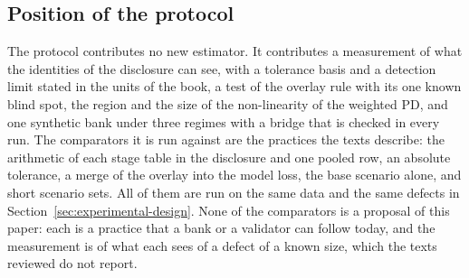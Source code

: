 \subsection{Position of the protocol}
\label{sec:rw-position}

The protocol contributes no new estimator.
It contributes a measurement of what the identities of the disclosure can see, with a tolerance basis and a detection limit stated in the units of the book, a test of the overlay rule with its one known blind spot, the region and the size of the non-linearity of the weighted PD, and one synthetic bank under three regimes with a bridge that is checked in every run.
The comparators it is run against are the practices the texts describe: the arithmetic of each stage table in the disclosure and one pooled row, an absolute tolerance, a merge of the overlay into the model loss, the base scenario alone, and short scenario sets.
All of them are run on the same data and the same defects in Section~\ref{sec:experimental-design}.
None of the comparators is a proposal of this paper: each is a practice that a bank or a validator can follow today, and the measurement is of what each sees of a defect of a known size, which the texts reviewed do not report.
